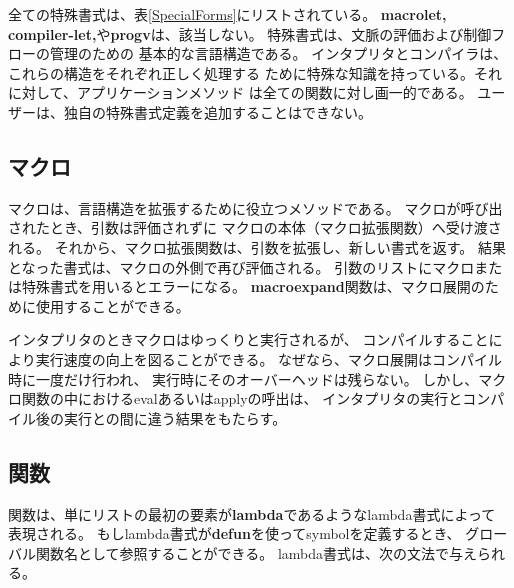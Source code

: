 全ての特殊書式は、表\ref{SpecialForms}にリストされている。
{\bf macrolet, compiler-let,}や{\bf progv}は、該当しない。
特殊書式は、文脈の評価および制御フローの管理のための
基本的な言語構造である。
インタプリタとコンパイラは、これらの構造をそれぞれ正しく処理する
ために特殊な知識を持っている。それに対して、アプリケーションメソッド
は全ての関数に対し画一的である。
ユーザーは、独自の特殊書式定義を追加することはできない。

\subsection{マクロ}

マクロは、言語構造を拡張するために役立つメソッドである。
マクロが呼び出されたとき、引数は評価されずに
マクロの本体（マクロ拡張関数）へ受け渡される。
それから、マクロ拡張関数は、引数を拡張し、新しい書式を返す。
結果となった書式は、マクロの外側で再び評価される。
引数のリストにマクロまたは特殊書式を用いるとエラーになる。
{\bf macroexpand}関数は、マクロ展開のために使用することができる。

インタプリタのときマクロはゆっくりと実行されるが、
コンパイルすることにより実行速度の向上を図ることができる。
なぜなら、マクロ展開はコンパイル時に一度だけ行われ、
実行時にそのオーバーヘッドは残らない。
しかし、マクロ関数の中におけるevalあるいはapplyの呼出は、
インタプリタの実行とコンパイル後の実行との間に違う結果をもたらす。

\subsection{関数}

関数は、単にリストの最初の要素が{\bf lambda}であるようなlambda書式によって
表現される。
もしlambda書式が{\bf defun}を使ってsymbolを定義するとき、
グローバル関数名として参照することができる。
lambda書式は、次の文法で与えられる。


